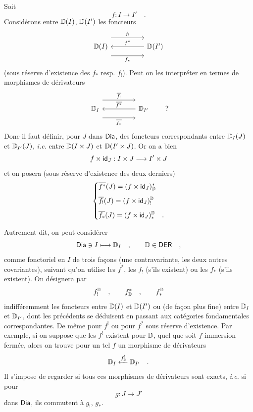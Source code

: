 Soit
\[
f : I \longrightarrow I' \quad .
\]
Considérons entre $\mathbb{D}(I)$, $\mathbb{D}(I')$ les foncteurs
\[
\begin{tikzcd}[column sep=huge]
\D(I) \arrow[r, shift left=3ex, "f_!"] \arrow[r, shift right=3ex, "f_*"'] & \D(I') \arrow[l, "f^*"']
\end{tikzcd}
\]
(sous réserve d'existence des $f_*$ resp. $f_!$). Peut on les interpréter en termes de morphismes de dérivateurs
\[
\begin{tikzcd}[column sep=huge]
\D_I \arrow[r, shift left=3ex, "\overline{f_!}"] \arrow[r, shift right=3ex, "\overline{f_*}"'] & \D_{I'} \arrow[l, "\overline{f^*}"']
\end{tikzcd}
\qquad ?
\]
Donc il faut définir, pour $J$ dans $\mathsf{Dia}$, des foncteurs correspondants entre $\mathbb{D}_I(J)$ et $\mathbb{D}_{I'}(J)$, \textit{i.e.} entre $\mathbb{D}(I \times J)$ et $\mathbb{D}(I' \times J)$. Or on a bien
\[
f \times \mathsf{id}_J : I \times J \longrightarrow I' \times J
\]
et on posera (sous réserve d'existence des deux derniers)
\[
\left\{
\begin{aligned}
&\overline{f^*}(J) = (f \times \mathsf{id}_J)^*_{\mathbb{D}} \\[1ex]
&\overline{f_!}(J) = (f \times \mathsf{id}_J)^{\mathbb{D}}_! \\[1ex]
&\overline{f_*}(J) = (f \times \mathsf{id}_J)^{\mathbb{D}}_* \quad .
\end{aligned}
\right.
\]


Autrement dit, on peut considérer
\[
\mathsf{Dia} \ni I \longmapsto \mathbb{D}_I \quad , \qquad \mathbb{D} \in \mathsf{DER} \quad ,
\]
comme fonctoriel en $I$ de trois façons (une contravariante, les deux autres covariantes), suivant qu'on utilise les $f^*$, les $f_!$ (s'ils existent) ou les $f_*$ (s'ils existent). On désignera par
\[
f^{\mathbb{D}}_! \quad , \qquad f^*_{\mathbb{D}} \quad , \qquad f^{\mathbb{D}}_*
\]
indifféremment les foncteurs entre $\mathbb{D}(I)$ et $\mathbb{D}(I')$ ou (de façon plus fine) entre $\mathbb{D}_I$ et $\mathbb{D}_{I'}$, dont les précédents se déduisent en passant aux catégories fondamentales correspondantes. De même pour $f^!$ ou pour $f^?$ sous réserve d'existence. Par exemple, si on suppose que les $f^!$ existent pour $\mathbb{D}$, quel que soit $f$ immersion fermée, alors on trouve pour un tel $f$ un morphisme de dérivateurs
\[
\mathbb{D}_I \xleftarrow{f^!_{\mathbb{D}}} \mathbb{D}_{I'} \quad .
\]
Il s'impose de regarder si tous ces morphismes de dérivateurs sont exacts, \textit{i.e.} si pour
\[
g : J \longrightarrow J'
\]
dans $\mathsf{Dia}$, ils commutent à $g_!$, $g_*$.



